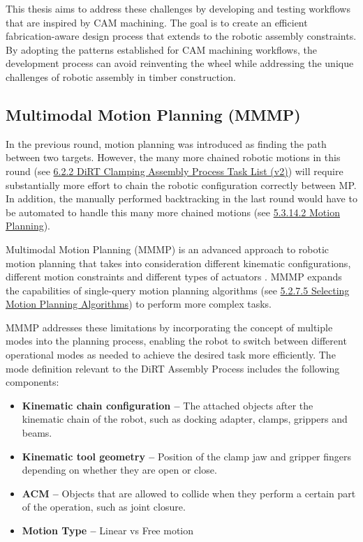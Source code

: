 This thesis aims to address these challenges by developing and testing workflows that are inspired by CAM machining. The goal is to create an efficient fabrication-aware design process that extends to the robotic assembly constraints. By adopting the patterns established for CAM machining workflows, the development process can avoid reinventing the wheel while addressing the unique challenges of robotic assembly in timber construction.

\vspace{2\baselineskip}
\subsection{Multimodal Motion Planning (MMMP)}
\label{subsection:exploration_3_multimodal_motion_planning_mmmp}

In the previous round, motion planning was introduced as finding the path between two targets. However, the many more chained robotic motions in this round (see \ul{6.2.2 DiRT Clamping Assembly Process Task List (v2)}) will require substantially more effort to chain the robotic configuration correctly between MP. In addition, the manually performed backtracking in the last round would have to be automated to handle this many more chained motions (see \ul{5.3.14.2 Motion Planning}). 

Multimodal Motion Planning (MMMP) is an advanced approach to robotic motion planning that takes into consideration different kinematic configurations, different motion constraints and different types of actuators \parencite{hauserMultimodalMotionPlanning2010, hauserRandomizedMultimodalMotion2011}. MMMP expands the capabilities of single-query motion planning algorithms (see \ul{5.2.7.5 Selecting Motion Planning Algorithms}) to perform more complex tasks.

MMMP addresses these limitations by incorporating the concept of multiple modes into the planning process, enabling the robot to switch between different operational modes as needed to achieve the desired task more efficiently. The mode definition relevant to the DiRT Assembly Process includes the following components:

\begin{itemize}
	\item \textbf{Kinematic chain configuration --} The attached objects after the kinematic chain of the robot, such as docking adapter, clamps, grippers and beams.
	\item \textbf{Kinematic tool geometry --} Position of the clamp jaw and gripper fingers depending on whether they are open or close.
	\item \textbf{ACM --} Objects that are allowed to collide when they perform a certain part of the operation, such as joint closure.
	\item \textbf{Motion Type --} Linear vs Free motion
\end{itemize}

